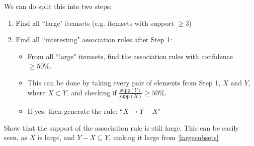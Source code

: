 \documentclass[../main/main.tex]{subfiles}
\begin{document}
We can do split this into two steps:
\begin{enumerate}
	\item Find all ``large" itemsets (e.g. itemsets with support $\ge 3$)
	\item Find all ``interesting" association rules after Step 1:
		\begin{itemize}
			\item From all ``large" itemsets, find the association rules with confidence $\ge 50\%$.
			\item This can be done by taking every pair of elements from Step 1, $X$ and  $Y$, where  $X\subset Y$, and checking if $\frac{\text{supp}(Y)}{\text{supp}(X)}\ge 50\%$. 
			\item If yes, then generate the rule: ``$X\to Y-X$"
			\end{itemize}
\end{enumerate}
\begin{description}
	\item[Homework]
	\item Show that the support of the association rule is still large. This can be easily seen, as $X$ is large, and  $Y-X\subseteq Y$, making it large from \ref{largesubsets}
\end{description}
\end{document}
